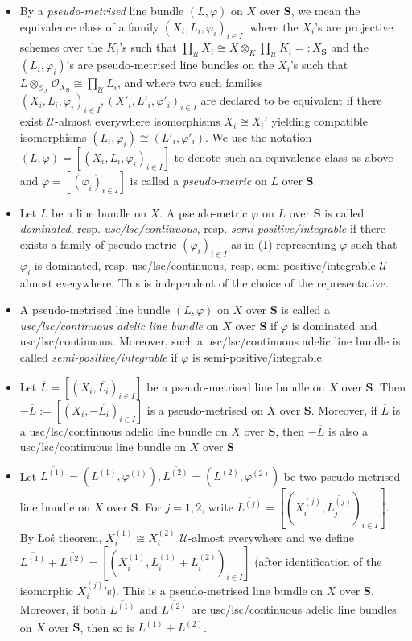 \documentclass [11pt,reqno]{amsart}
\newcommand{\1}{\mathmybb{1}}
\def\cO{{\mathcal{O}}}
\def\cU{{\mathcal{U}}}
\begin{document}
\begin{proposition-definition}
\label{prop-def:pseudo-metric_family_tac}
\begin{itemize}
	\item[(1)] By a \emph{pseudo-metrised} line bundle $(L,\varphi)$ on $X$ over $\mathbf{S}$, we mean the equivalence class of a family $(X_{i},L_{i},\varphi_{i})_{i\in I}$, where the $X_{i}$'s are projective schemes over the $K_{i}$'s such that $\prod_{\cU}X_{i}\cong X\otimes_{K}\prod_{\cU}K_{i}=:X_{\mathbf{S}}$ and the $(L_{i},\varphi_{i})$'s are pseudo-metrised line bundles on the $X_{i}$'s such that $L\otimes_{\cO_{X}}\cO_{X_{\mathbf{S}}}\cong \prod_{\cU}L_{i}$, and where two such families $(X_{i},L_{i},\varphi_{i})_{i\in I},(X'_{i},L'_{i},\varphi'_{i})_{i\in I}$ are declared to be equivalent if there exist $\cU$-almost everywhere isomorphisms $X_{i}\cong X_{i}'$ yielding compatible isomorphisms $(L_{i},\varphi_{i})\cong(L'_{i},\varphi'_{i})$. We use the notation $(L,\varphi)=[(X_{i},L_{i},\varphi_{i})_{i\in I}]$ to denote such an equivalence class as above and $\varphi=[(\varphi_{i})_{i\in I}]$ is called a \emph{pseudo-metric} on $L$ over $\mathbf{S}$.
	\item[(2)] Let $L$ be a line bundle on $X$. A pseudo-metric $\varphi$ on $L$ over $\mathbf{S}$ is called \emph{dominated}, resp. \emph{usc/lsc/continuous}, resp. \emph{semi-positive/integrable} if there exists a family of pseudo-metric $(\varphi_{i})_{i\in I}$ as in (1) representing $\varphi$ such that $\varphi_{i}$ is dominated, resp. usc/lsc/continuous, resp. semi-positive/integrable $\cU$-almost everywhere. This is independent of the choice of the representative.
	\item[(3)] A pseudo-metrised line bundle $(L,\varphi)$ on $X$ over $\mathbf{S}$ is called a \emph{usc/lsc/continuous adelic line bundle} on $X$ over $\mathbf{S}$ if $\varphi$ is dominated and usc/lsc/continuous. Moreover, such a usc/lsc/continuous adelic line bundle is called \emph{semi-positive/integrable} if $\varphi$ is semi-positive/integrable.
	\item[(4)] Let $\overline{L}=[(X_{i},\overline{L_{i}})_{i\in I}]$ be a pseudo-metrised line bundle on $X$ over $\mathbf{S}$. Then $-\overline{L}:= [(X_{i},-\overline{L_{i}})_{i\in I}]$ is a pseudo-metrised on $X$ over $\mathbf{S}$. Moreover, if $\overline{L}$ is a usc/lsc/continuous adelic line bundle on $X$ over $\mathbf{S}$, then $-\overline{L}$ is also a usc/lsc/continuous line bundle on $X$ over $\mathbf{S}$
	\item[(5)] Let $\overline{L^{(1)}}=(L^{(1)},\varphi^{(1)}),\overline{L^{(2)}}=(L^{(2)},\varphi^{(2)})$ be two pseudo-metrised line bundle on $X$ over $\mathbf{S}$. For $j=1,2$, write $\overline{L^{(j)}}=[(X^{(j)}_{i},\overline{L_{j}^{(j)}})_{i\in I}]$. By \L{}o\'s theorem, $X_{i}^{(1)}\cong X_{i}^{(2)}$ $\cU$-almost everywhere and we define $\overline{L^{(1)}}+\overline{L^{(2)}}=[(X^{(1)}_{i},\overline{L_{i}^{(1)}}+\overline{L_{i}^{(2)}})_{i\in I}]$ (after identification of the isomorphic $X^{(j)}_{i}$'s). This is a pseudo-metrised line bundle on $X$ over $\mathbf{S}$. Moreover, if both $\overline{L^{(1)}}$ and $\overline{L^{(2)}}$ are usc/lsc/continuous adelic line bundles on $X$ over $\mathbf{S}$, then so is $\overline{L^{(1)}}+\overline{L^{(2)}}$.

\end{itemize}
\end{proposition-definition}
\end{document}
